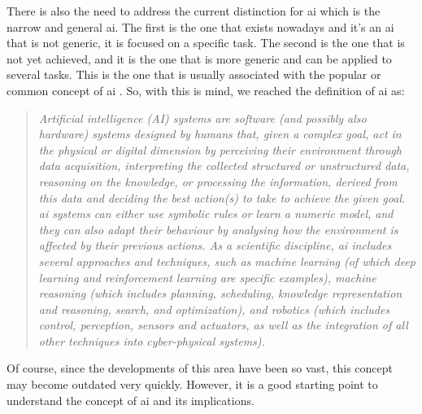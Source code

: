 There is also the need to address the current distinction for \ac{ai} which is the narrow and general \ac{ai}. The first is the one that exists nowadays and it's an \ac{ai} that is not generic, it is focused on a specific task. The second is the one that is not yet achieved, and it is the one that is more generic and can be applied to several tasks. This is the one that is usually associated with the popular or common concept of \ac{ai} \cite{DefinitionAIMain2019,DBLP:books/aw/RN2020}. So, with this is mind, we reached the definition of \ac{ai} as:
\begin{quote}
    \textit{Artificial intelligence (AI) systems are software (and possibly also hardware) systems designed by humans that, given a complex goal, act in the physical or digital dimension by perceiving their environment through data acquisition, interpreting the collected structured or unstructured data, reasoning on the knowledge, or processing the information, derived from this data and deciding the best action(s) to take to achieve the given goal. \ac{ai} systems can either use symbolic rules or learn a numeric model, and they can also adapt their behaviour by analysing how the environment is affected by their previous actions. As a scientific discipline, \ac{ai} includes several approaches and techniques, such as machine learning (of which deep learning and reinforcement learning are specific examples), machine reasoning (which includes planning, scheduling, knowledge representation and reasoning, search, and optimization), and robotics (which includes control, perception, sensors and actuators, as well as the integration of all other techniques into cyber-physical systems).} \cite{DefinitionAIMain2019}
    \end{quote}

Of course, since the developments of this area have been so vast, this concept may become outdated very quickly. However, it is a good starting point to understand the concept of \ac{ai} and its implications.



